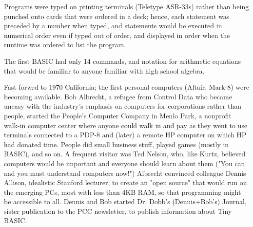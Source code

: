 \documentclass{article}
\begin{document}
Programs were typed on printing terminals (Teletype ASR-33s) rather than
being punched onto cards that were ordered in a deck; hence, each
statement was preceded by a number when typed, and statements would be
executed in numerical order even if typed out of order, and displayed in
order when the runtime was ordered to list the program.



The first BASIC had only 14 commands, and notation for arithmetic
equations that would be familiar to anyone familiar with high school algebra.



Fast forwrd to 1970 California; the first personal computers (Altair,
Mark-8) were becoming available.  Bob Albrecht, a refugee from Control
Data who became uneasy with the industry's emphasis on computers for
corporations rather than people, 
started the People's Computer Company in Menlo Park, a nonprofit walk-in
computer center where anyone could walk in and pay as they went to use
terminals connected to a PDP-8 and (later) a remote HP computer on which
HP had donated time.  People did small business stuff, played games
(mostly in BASIC), and so on.
A frequent visitor was Ted Nelson, who, like Kurtz, believed computers
would be important and everyone should learn about them ("You can and
you must understand computers now!")
Albrecht convinced colleague Dennis Allison,
idealistic Stanford lecturer, to create an "open source"  that
would run on the emerging PCs, most with less than 4KB RAM, so that
programming might be accessible to all.  Dennis and
Bob started Dr. Dobb's (Dennis+Bob's) Journal, sister publication to the
PCC newsletter, to publish information about Tiny BASIC.




\end{document}
